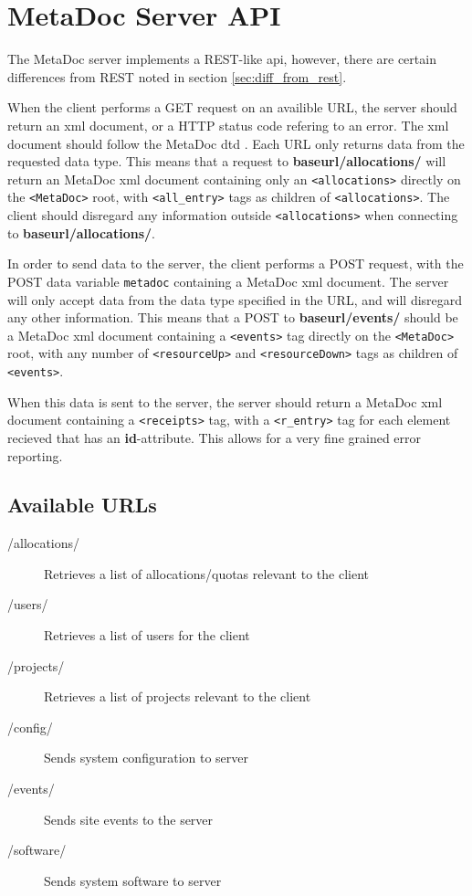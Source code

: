 \newpage
\section{MetaDoc Server API}
\label{sec:server_api}

The MetaDoc server implements a REST-like \gls{api}, however, there are certain
differences from REST noted in section \ref{sec:diff_from_rest}.

When the client performs a GET request on an availible URL, the server should
return an \gls{xml} document, or a HTTP status code refering to an error.  The
\gls{xml} document should follow the MetaDoc \gls{dtd} \cite{metadoc_dtd}. Each
URL only returns data from the requested data type. This means that a request
to \textbf{baseurl/allocations/} will return an MetaDoc \gls{xml} document
containing only an \texttt{<allocations>} directly on the \texttt{<MetaDoc>}
root, with \texttt{<all\_entry>} tags as children of \texttt{<allocations>}.
The client should disregard any information outside \texttt{<allocations>} when
connecting to \textbf{baseurl/allocations/}. 

In order to send data to the server, the client performs a POST request, with
the POST data variable \texttt{metadoc} containing a MetaDoc \gls{xml}
document. The server will only accept data from the data type specified in the
URL, and will disregard any other information. This means that a POST to
\textbf{baseurl/events/} should be a MetaDoc \gls{xml} document containing a
\texttt{<events>} tag directly on the \texttt{<MetaDoc>} root, with any number
of \texttt{<resourceUp>} and \texttt{<resourceDown>} tags as children of
\texttt{<events>}. 

When this data is sent to the server, the server should return a MetaDoc
\gls{xml} document containing a \texttt{<receipts>} tag, with a
\texttt{<r\_entry>} tag for each element recieved that has an
\textbf{id}-attribute. This allows for a very fine grained error reporting.

\subsection{Available URLs}

\begin{description}
    \item[/allocations/] Retrieves a list of allocations/quotas relevant
        to the client
    \item[/users/] Retrieves a list of users for the client
    \item[/projects/] Retrieves a list of projects relevant to the
        client
    \item[/config/] Sends system configuration to server
    \item[/events/] Sends site events to the server
    \item[/software/] Sends system software to server
\end{description}

